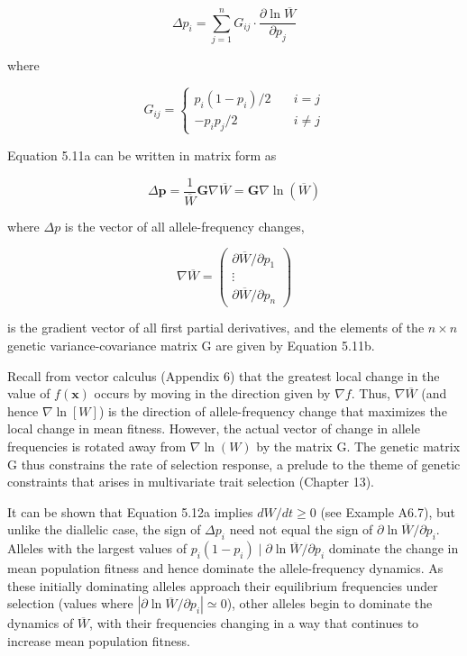 \documentclass{article}
\begin{document}
\begin{equation}
\Delta p_{i}=\sum_{j=1}^{n}G_{ij}\cdot\frac{\partial\ln\overline{W}}{\partial p_{j}}
\tag{5.11a}
\label{eq:5_11a}
\end{equation}

where

\begin{equation}
G_{ij}=\left\{\begin{aligned}p_{i}(1-p_{i})/2&\quad i=j\\ -p_{i}p_{j}/2&\quad i\neq j\end{aligned}\right.
\tag{5.11b}
\label{eq:5_11b}
\end{equation}

Equation 5.11a can be written in matrix form as

\begin{equation}
\Delta\mathbf{p}=\frac{1}{\overline{W}}\mathbf{G}\nabla\overline{W}=\mathbf{G}\nabla\ln(\overline{W})
\tag{5.12a}
\label{eq:5_12a}
\end{equation}

where  $ \Delta p $ is the vector of all allele-frequency changes,

\begin{equation}
\nabla\overline{W}=\begin{pmatrix}\partial\overline{W}/\partial p_{1}\\ \vdots\\ \partial\overline{W}/\partial p_{n}\end{pmatrix}
\tag{5.12b}
\label{eq:5_12b}
\end{equation}

is the gradient vector of all first partial derivatives, and the elements of the  $ n \times n $ genetic variance-covariance matrix G are given by Equation 5.11b.

Recall from vector calculus (Appendix 6) that the greatest local change in the value of  $ f(\mathbf{x}) $ occurs by moving in the direction given by  $ \nabla f $. Thus,  $ \nabla \overline{W} $ (and hence  $ \nabla \ln[W] $) is the direction of allele-frequency change that maximizes the local change in mean fitness. However, the actual vector of change in allele frequencies is rotated away from  $ \nabla \ln(W) $ by the matrix G. The genetic matrix G thus constrains the rate of selection response, a prelude to the theme of genetic constraints that arises in multivariate trait selection (Chapter 13).

It can be shown that Equation 5.12a implies  $ dW/dt \geq 0 $ (see Example A6.7), but unlike the diallelic case, the sign of  $ \Delta p_i $ need not equal the sign of  $ \partial \ln \overline{W}/\partial p_i $. Alleles with the largest values of  $ p_i(1 - p_i) \mid \partial \ln \overline{W}/\partial p_i $ dominate the change in mean population fitness and hence dominate the allele-frequency dynamics. As these initially dominating alleles approach their equilibrium frequencies under selection (values where  $ |\partial \ln \overline{W}/\partial p_i| \simeq 0 $), other alleles begin to dominate the dynamics of  $ \overline{W} $, with their frequencies changing in a way that continues to increase mean population fitness.
\end{document}
